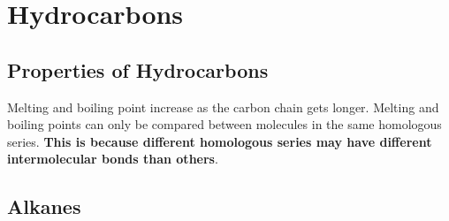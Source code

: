 \documentclass[11pt,twoside]{article}
\begin{document}
	\tableofcontents

	\section{Hydrocarbons}
		\subsection{Properties of Hydrocarbons}
			Melting and boiling point increase as the carbon chain gets longer. Melting and boiling points can only be compared between molecules in the same homologous series. \textbf{This is because different homologous series may have different intermolecular bonds than others}.	
			
		\subsection{Alkanes}
\end{document}
